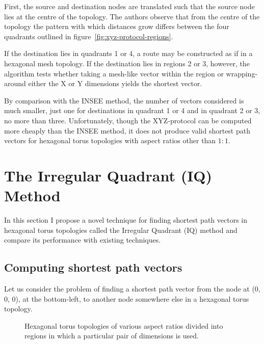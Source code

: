 				First, the source and destination nodes are translated such that the
				source node lies at the centre of the topology. The authors observe
				that from the centre of the topology the pattern with which distances
				grow differs between the four quadrants outlined in
				figure~\ref{fig:xyz-protocol-regions}.
				
				If the destination lies in quadrants 1 or 4, a route may be constructed
				as if in a hexagonal mesh topology. If the destination lies in regions
				2 or 3, however, the algorithm tests whether taking a mesh-like vector
				within the region or wrapping-around either the X or Y dimensions
				yields the shortest vector.
				
				By comparison with the INSEE method, the number of vectors considered
				is much smaller, just one for destinations in quadrant 1 or 4 and in
				quadrant 2 or 3, no more than three. Unfortunately, though the
				XYZ-protocol can be computed more cheaply than the INSEE method, it
				does not produce valid shortest path vectors for hexagonal torus
				topologies with aspect ratios other than $1:1$.
		
	\section{The Irregular Quadrant (IQ) Method}
		
		In this section I propose a novel technique for finding shortest path
		vectors in hexagonal torus topologies called the Irregular Quadrant (IQ)
		method and compare its performance with existing techniques.
		
		\subsection{Computing shortest path vectors}
		
			Let us consider the problem of finding a shortest path vector from the node
			at (0, 0, 0), at the bottom-left, to another node somewhere else in a
			hexagonal torus topology.
			
			\begin{figure}
				\center
				
				\caption[The four regions defined by the IQ method.]%
				{Hexagonal torus topologies of various aspect ratios divided
				into regions in which a particular pair of dimensions is used.}
				\label{fig:shortest-path-regions}
			\end{figure}
			

